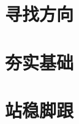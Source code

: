 \documentclass{si_template/cn_book}
\begin{document}
\frontmatter
\mainmatter
\chapter{寻找方向}\label{chap:find_direction}

\chapter{夯实基础}\label{chap:build_basic}

\chapter{站稳脚跟}\label{chap:stand_up}


\backmatter
\end{document}
